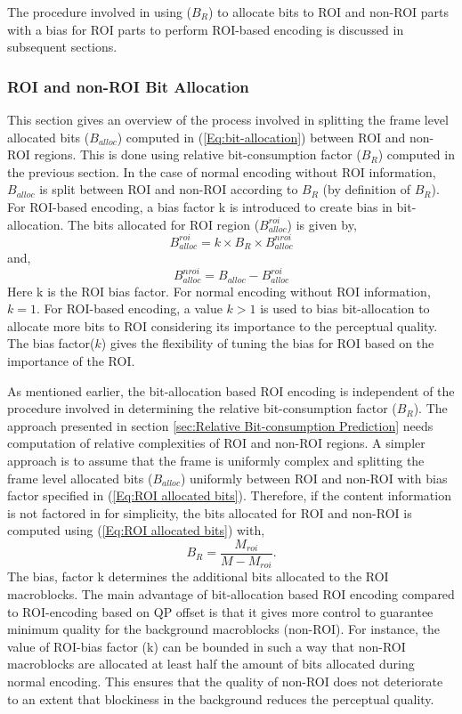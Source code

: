 \documentclass[11pt]{article} %
\begin{document}
The procedure involved in using ($B_R$) to allocate bits to ROI and non-ROI parts with a bias for ROI parts to perform ROI-based encoding is discussed in subsequent sections.

\subsubsection{ROI and non-ROI Bit Allocation}
This section gives an overview of the process involved in splitting the frame level allocated bits ($B_{alloc}$) computed in (\ref{Eq:bit-allocation}) between ROI and non-ROI regions. This is done using relative bit-consumption factor ($B_R$) computed in the previous section. In the case of normal encoding without ROI information, $B_{alloc}$ is split between ROI and non-ROI according to $B_R$ (by definition of $B_R$). For ROI-based encoding, a bias factor k is introduced to create bias in bit-allocation. The bits allocated for ROI region ($B_{alloc}^{roi}$) is given by,
\begin{equation}
\label{Eq:ROI allocated bits}
B_{alloc}^{roi} = k \times B_R \times B_{alloc}^{nroi}
\end{equation}
and,
$$ B_{alloc}^{nroi} = B_{alloc} - B_{alloc}^{roi}$$
Here k is the ROI bias factor. For normal encoding without ROI information, $k = 1$. For ROI-based encoding, a value $k > 1$ is used to bias bit-allocation to allocate more bits to ROI considering its importance to the perceptual quality. The bias factor($k$) gives the flexibility of tuning the bias for ROI based on the importance of the ROI.

As mentioned earlier, the bit-allocation based ROI encoding is independent of the procedure involved in determining the relative bit-consumption factor ($B_R$). The approach presented in section \ref{sec:Relative Bit-consumption Prediction} needs computation of relative complexities of ROI and non-ROI regions. A simpler approach is to assume that the frame is uniformly complex and splitting the frame level allocated bits ($B_{alloc}$) uniformly between ROI and non-ROI with bias factor specified in (\ref{Eq:ROI allocated bits}). Therefore, if the content information is not factored in for simplicity, the bits allocated for ROI and non-ROI is computed using (\ref{Eq:ROI allocated bits}) with,
$$B_R = \frac{M_{roi}}{M - M_{roi}}.$$ 
The bias, factor k determines the additional bits allocated to the ROI macroblocks. The main advantage of bit-allocation based ROI encoding compared to ROI-encoding based on QP offset is that it gives more control to guarantee minimum quality for the background macroblocks (non-ROI). For instance, the value of ROI-bias factor (k) can be bounded in such a way that non-ROI macroblocks are allocated at least half the amount of bits allocated during normal encoding. This ensures that the quality of non-ROI does not deteriorate to an extent that blockiness in the background reduces the perceptual quality.
\end{document}

